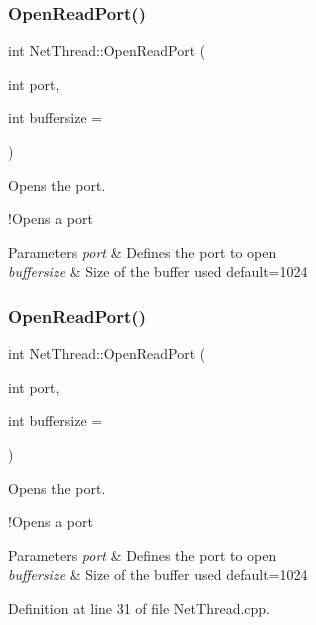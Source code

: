 \subsubsection{\texorpdfstring{Open\+Read\+Port()}{OpenReadPort()}\hspace{0.1cm}{\footnotesize\ttfamily [1/2]}}
{\footnotesize\ttfamily int Net\+Thread\+::\+Open\+Read\+Port (\begin{DoxyParamCaption}\item[{int}]{port,  }\item[{int}]{buffersize = {} }\end{DoxyParamCaption})}



Opens the port. 

!\+Opens a port 
\begin{DoxyParams}{Parameters}
{\em port} & Defines the port to open \\
\hline
{\em buffersize} & Size of the buffer used default=1024 \\
\hline
\end{DoxyParams}
\mbox{\label{class_net_thread_a3b51d5da0cf27b5c59c91da22b859312}} 
\subsubsection{\texorpdfstring{Open\+Read\+Port()}{OpenReadPort()}\hspace{0.1cm}{\footnotesize\ttfamily [2/2]}}
{\footnotesize\ttfamily int Net\+Thread\+::\+Open\+Read\+Port (\begin{DoxyParamCaption}\item[{int}]{port,  }\item[{int}]{buffersize = {} }\end{DoxyParamCaption})}



Opens the port. 

!\+Opens a port 
\begin{DoxyParams}{Parameters}
{\em port} & Defines the port to open \\
\hline
{\em buffersize} & Size of the buffer used default=1024 \\
\hline
\end{DoxyParams}


Definition at line 31 of file Net\+Thread.\+cpp.



